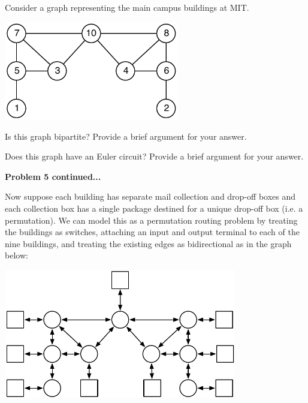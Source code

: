 \documentclass[12pt,oneside]{article}
\begin{document}
%
\begin{problem}{15}
Consider a graph representing the main campus buildings at MIT.

\vspace{18pt}
\centerline{\includegraphics[width=3in]{maclaurin-graph}}
\vspace{18pt}

\bparts

 Is this graph bipartite? Provide a brief argument for your answer.

 Does this graph have an Euler circuit? Provide a brief argument for your answer.

\newpage
\textbf{Problem 5 continued...}

Now suppose each building has separate mail collection and drop-off boxes and each collection box has a single package destined for a unique drop-off box (i.e. a permutation). We can model this as a permutation routing problem by treating the buildings as switches, attaching an input and output terminal to each of the nine buildings, and treating the existing edges as bidirectional as in the graph below:

\vspace{18pt}
\centerline{\includegraphics[width=4in]{maclaurin-routing}}
\vspace{18pt}


\end{problem}
\end{document}

